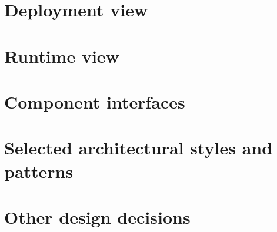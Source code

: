 \section{Deployment view}
\section{Runtime view}
\section{Component interfaces}
\section{Selected architectural styles and patterns}
\section{Other design decisions}

